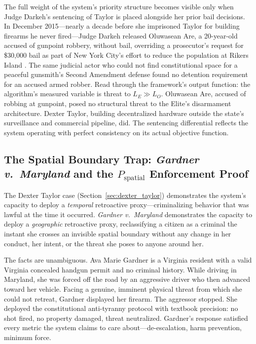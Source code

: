 The full weight of the system's priority structure becomes visible only when Judge Darkeh's sentencing of Taylor is placed alongside her prior bail decisions. In December 2015---nearly a decade before she imprisoned Taylor for building firearms he never fired---Judge Darkeh released Oluwasean Are, a 20-year-old accused of gunpoint robbery, without bail, overriding a prosecutor's request for \$30,000 bail as part of New York City's effort to reduce the population at Rikers Island \cite{nypost_darkeh_2015}. The same judicial actor who could not find constitutional space for a peaceful gunsmith's Second Amendment defense found no detention requirement for an accused armed robber. Read through the framework's output function: the algorithm's measured variable is threat to $L_E \gg L_O$. Oluwasean Are, accused of robbing at gunpoint, posed no structural threat to the Elite's disarmament architecture. Dexter Taylor, building decentralized hardware outside the state's surveillance and commercial pipeline, did. The sentencing differential reflects the system operating with perfect consistency on its actual objective function.

\subsection{The Spatial Boundary Trap: \textit{Gardner v.\ Maryland} and the $P_{\text{spatial}}$ Enforcement Proof}
\label{subsec:gardner_proof}

The Dexter Taylor case (Section~\ref{sec:dexter_taylor}) demonstrates the system's capacity to deploy a \textit{temporal} retroactive proxy---criminalizing behavior that was lawful at the time it occurred. \textit{Gardner v.\ Maryland} demonstrates the capacity to deploy a \textit{geographic} retroactive proxy, reclassifying a citizen as a criminal the instant she crosses an invisible spatial boundary without any change in her conduct, her intent, or the threat she poses to anyone around her.

The facts are unambiguous. Ava Marie Gardner is a Virginia resident with a valid Virginia concealed handgun permit and no criminal history. While driving in Maryland, she was forced off the road by an aggressive driver who then advanced toward her vehicle. Facing a genuine, imminent physical threat from which she could not retreat, Gardner displayed her firearm. The aggressor stopped. She deployed the constitutional anti-tyranny protocol with textbook precision: no shot fired, no property damaged, threat neutralized. Gardner's response satisfied every metric the system claims to care about---de-escalation, harm prevention, minimum force.

